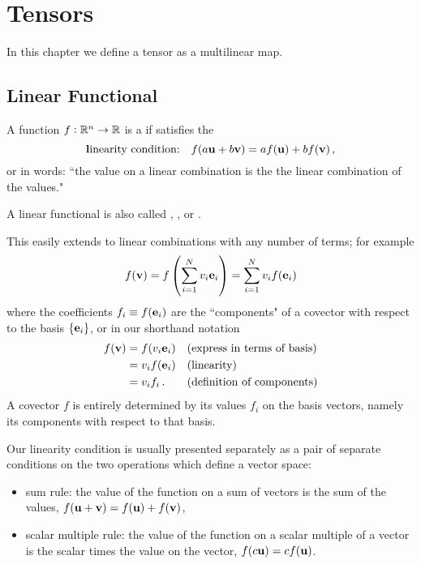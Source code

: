 \chapter{Tensors}





In this chapter we define a tensor  as a multilinear  map. 


\section{Linear Functional }
\label{sec:DS}



\begin{df}
A function $f:\mathbb{R}^n\to \mathbb{R}$ is a   if satisfies the 
$$
\text{\textbf linearity condition:\quad}
f(a \mathbf{ u}+ b \mathbf{ v}) = a f(\mathbf{ u}) + b f(\mathbf{ v})\,,
$$
or in words:
``the value on a linear combination  is the the linear combination of the values."
\end{df}

A linear functional  is also called  , , or .




This easily extends to linear combinations with any number of terms; for example 
$$
 f(\mathbf{ v}) =f\left(\displaystyle\sum_{i=1}^N v_i \mathbf{ e}_i\right) = \displaystyle\sum_{i=1}^N v_i f(\mathbf{ e}_i)
$$
where the coefficients $f_i\equiv f(\mathbf{ e}_i) $ are the ``components" of a covector with respect to the basis $\{\mathbf{ e}_i\}$,
or in our shorthand notation 
\begin{align*}
f(\mathbf{ v}) &= f(v_i \mathbf{ e}_i) &&\text{(express in terms of basis)}\\
&= v_i f(\mathbf{ e}_i) &&\text{(linearity)}\\
&= v_i f_i \,.&&\text{(definition of components)}
\end{align*}
A covector $f$ is entirely determined by its values $f_i$ on the basis vectors, namely its components with respect to that basis. 

Our linearity condition is usually presented separately as a pair of separate conditions on the two operations which define a vector space:
\begin{itemize}
  \item sum rule: the value of the function on a sum of vectors is the sum of the values, $f(\mathbf{ u}+\mathbf{ v})=f(\mathbf{ u})+f(\mathbf{ v})$,
  \item scalar multiple rule: the value of the function on a scalar multiple of a vector is the scalar times the value on the vector, $f(c\mathbf{ u})=cf(\mathbf{ u})$.
\end{itemize}

